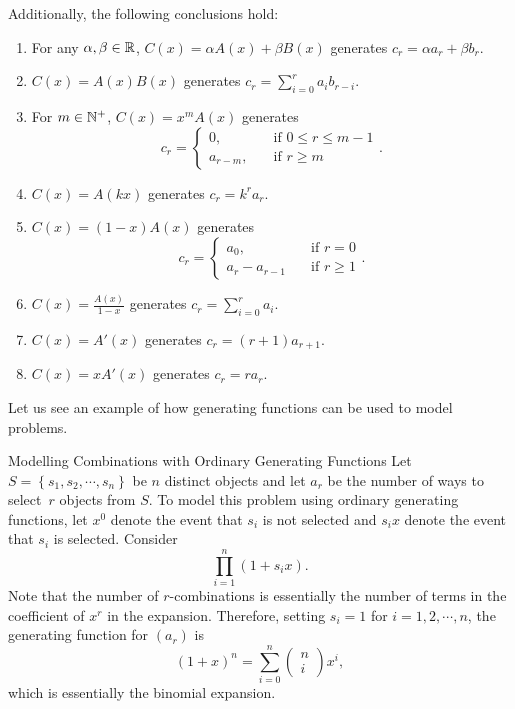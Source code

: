 \documentclass[math]{amznotes}
\theoremstyle{remark}
\newcommand{\0}{\mathbf{0}}
\newcommand{\1}{\mathbf{1}}
\begin{document}
Additionally, the following conclusions hold:
\begin{enumerate}
    \item For any $\alpha, \beta \in \mathbb{R}$, $C(x) = \alpha A(x) + \beta B(x)$ generates $c_r = \alpha a_r + \beta b_r$.
    \item $C(x) = A(x)B(x)$ generates $c_r = \sum_{i = 0}^{r}a_ib_{r - i}$.
    \item For $m \in \mathbb{N}^+$, $C(x) = x^mA(x)$ generates 
    \begin{equation*}
        c_r = \begin{cases}
            0, & \quad\textrm{if } 0 \leq r \leq m - 1 \\
            a_{r - m}, & \quad\textrm{if } r \geq m
        \end{cases}.
    \end{equation*}
    \item $C(x) = A(kx)$ generates $c_r = k^ra_r$.
    \item $C(x) = (1 - x)A(x)$ generates
    \begin{equation*}
        c_r = \begin{cases}
            a_0, & \quad\textrm{if } r = 0 \\
            a_r - a_{r - 1} & \quad\textrm{if } r \geq 1
        \end{cases}.
    \end{equation*}
    \item $C(x) = \frac{A(x)}{1 - x}$ generates $c_r = \sum_{i = 0}^{r}a_i$.
    \item $C(x) = A'(x)$ generates $c_r = (r + 1)a_{r + 1}$.
    \item $C(x) = xA'(x)$ generates $c_r = ra_r$.
\end{enumerate}
Let us see an example of how generating functions can be used to model problems.
\begin{tecbox}{\small Modelling Combinations with Ordinary Generating Functions}{}
    Let $S = \left\{s_1, s_2, \cdots, s_n\right\}$ be $n$ distinct objects and let $a_r$ be the number of ways to select~$r$ objects from $S$. To model this problem using ordinary generating functions, let $x^0$ denote the event that $s_i$ is not selected and $s_ix$ denote the event that $s_i$ is selected. Consider
    \begin{equation*}
        \prod_{i = 1}^{n}(1 + s_ix).
    \end{equation*}
    Note that the number of $r$-combinations is essentially the number of terms in the coefficient of $x^r$ in the expansion. Therefore, setting $s_i = 1$ for $i = 1, 2, \cdots, n$, the generating function for $(a_r)$ is
    \begin{equation*}
        (1 + x)^n = \sum_{i = 0}^{n}\begin{pmatrix}
            n \\
            i
        \end{pmatrix}x^i,
    \end{equation*}
    which is essentially the binomial expansion.
\end{tecbox}
\end{document}
